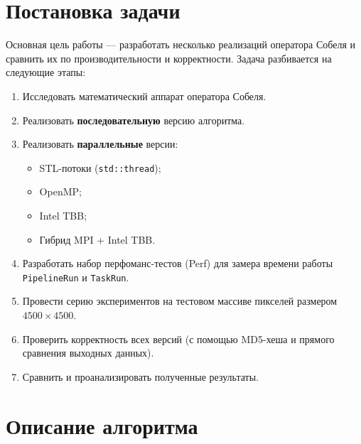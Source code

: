 \documentclass[12pt]{article}
\begin{document}
\section{Постановка задачи}

Основная цель работы — разработать несколько реализаций оператора Собеля и сравнить их по производительности и корректности. Задача разбивается на следующие этапы:
\begin{enumerate}
    \item Исследовать математический аппарат оператора Собеля.
    \item Реализовать \textbf{последовательную} версию алгоритма.
    \item Реализовать \textbf{параллельные} версии:
    \begin{itemize}
        \item STL-потоки (\texttt{std::thread});
        \item OpenMP;
        \item Intel TBB;
        \item Гибрид MPI + Intel TBB.
    \end{itemize}
    \item Разработать набор перфоманс-тестов (Perf) для замера времени работы \lstinline[breaklines]{PipelineRun} и \lstinline[breaklines]{TaskRun}.
    \item Провести серию экспериментов на тестовом массиве пикселей размером $4500 \times 4500$.
    \item Проверить корректность всех версий (с помощью MD5-хеша и прямого сравнения выходных данных).
    \item Сравнить и проанализировать полученные результаты.
\end{enumerate}

\section{Описание алгоритма}
\end{document}
